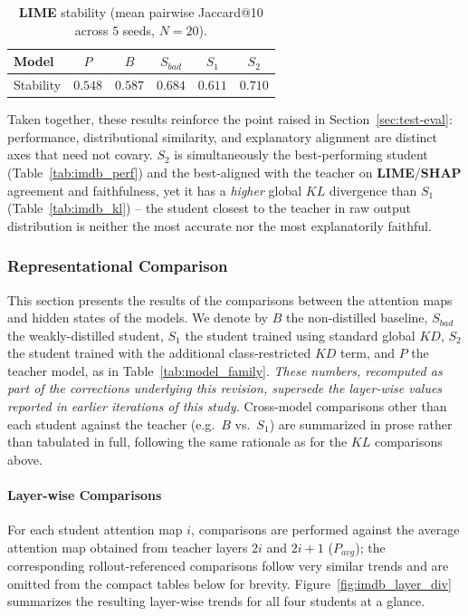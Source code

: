 \documentclass[conference]{IEEEtran}
\begin{document}
\begin{table}[h!]
\centering
\caption{\textbf{LIME} stability (mean pairwise Jaccard@10 across $5$ seeds, $N=20$).}
\begin{tabular}{|l|c|c|c|c|c|}
\hline
Model & $P$ & $B$ & $S_{bad}$ & $S_1$ & $S_2$ \\ \hline
Stability & $0.548$ & $0.587$ & $0.684$ & $0.611$ & $0.710$ \\ \hline
\end{tabular}
\label{tab:imdb_stability}
\end{table}

Taken together, these results reinforce the point raised in Section~\ref{sec:test-eval}: performance, distributional similarity, and explanatory alignment are distinct axes that need not covary. $S_2$ is simultaneously the best-performing student (Table~\ref{tab:imdb_perf}) and the best-aligned with the teacher on \textbf{LIME}/\textbf{SHAP} agreement and faithfulness, yet it has a \emph{higher} global $KL$ divergence than $S_1$ (Table~\ref{tab:imdb_kl}) -- the student closest to the teacher in raw output distribution is neither the most accurate nor the most explanatorily faithful.

\subsubsection{Representational Comparison}\label{sec:imdb-repr}

This section presents the results of the comparisons between the attention maps and hidden states of the models. We denote by $B$ the non-distilled baseline, $S_{bad}$ the weakly-distilled student, $S_1$ the student trained using standard global $KD$, $S_2$ the student trained with the additional class-restricted $KD$ term, and $P$ the teacher model, as in Table~\ref{tab:model_family}. \emph{These numbers, recomputed as part of the corrections underlying this revision, supersede the layer-wise values reported in earlier iterations of this study.} Cross-model comparisons other than each student against the teacher (e.g.\ $B$ vs.\ $S_1$) are summarized in prose rather than tabulated in full, following the same rationale as for the $KL$ comparisons above.

\paragraph{Layer-wise Comparisons}

For each student attention map $i$, comparisons are performed against the average attention map obtained from teacher layers $2i$ and $2i+1$ ($P_{avg}$); the corresponding rollout-referenced comparisons follow very similar trends and are omitted from the compact tables below for brevity. Figure~\ref{fig:imdb_layer_div} summarizes the resulting layer-wise trends for all four students at a glance.
\end{document}

